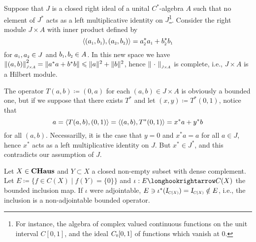 \begin{contraexemplo}
    Suppose that $J$ is a closed right ideal of a unital $C^{*}$-algebra $A$ such that no element of $J^{*}$ acts as a left multiplicative identity on $J$\footnote{For instance, the algebra of complex valued continuous functions on the unit interval $C[0,1]$, and the ideal $\sub C0[0,1]$ of functions which vanish at 0.}. Consider the right module $J \times A$ with inner product defined by 
    \begin{equation*}
    \inner{\left(\sub a{1}, \sub b{1}\right)}{\left(\sub a{2}, \sub b{2}\right)} = \sub a{2}^{*} \sub a{1}+\sub b{2}^{*} \sub b{1}
    \end{equation*}
    for $\sub a1, \sub a2 \in J$ and $\sub b1, \sub b2 \in A$. In this new space we have $\sub{\|(a, b)\|}{J\times A}^2=\left\|a^{*} a+b^* b\right\|\leq \|a\|^{2}+\|b\|^{2}$, hence $\sub{\|\come\|}{J\times A}$ is complete, i.e., $J\times A$ is a Hilbert module. 
    
    The operator $T(a,b)\coloneqq (0,a)$ for each $(a,b) \in J\times A$ is obviously a bounded one, but if we suppose that there exists $T^*$ and let $(x,y) \coloneqq T^*(0,1)$, notice that
    \begin{equation*}
        a = \langle {T(a,b)},{(0,1)}\rangle = \langle {(a,b)},{T^*(0,1)}\rangle = x^*a+y^*b
    \end{equation*}
    for all $(a,b)$. Necessarilly, it is the case that $y=0$ and $x^*a=a$ for all $a\in J$, hence $x^*$ acts as a left multiplicative identity on $J$. But $x^* \in J^*$, and this contradicts our assumption of $J$.
\end{contraexemplo}
    
\begin{contraexemplo}
    Let $X\in \boldsymbol{\operatorname{CHaus}}$ and $Y \subset X$ a closed non-empty subset with dense complement. Let $E \coloneqq \big\{f \in C(X) \mid f(Y) = \{0\}\big\}$ and $\iota : E \longhookrightarrow C(X)$ the bounded inclusion map. If $\iota$ were adjointable, $E \ni \iota^*(\sub\Id{C(X)}) = \sub\Id{C(X)} \notin E$, i.e., the inclusion is a non-adjointable bounded operator.
\end{contraexemplo}
        
